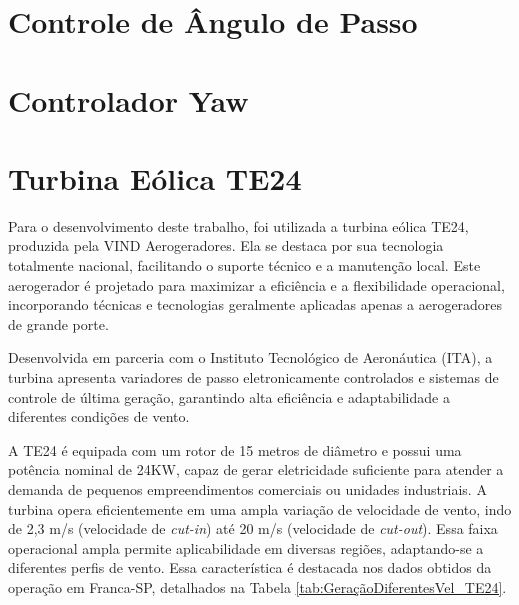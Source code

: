         
\section{Controle de Ângulo de Passo}
\section{Controlador Yaw}

\section{Turbina Eólica TE24}
    \par Para o desenvolvimento deste trabalho, foi utilizada a turbina eólica TE24, produzida pela VIND Aerogeradores. Ela se destaca por sua tecnologia totalmente nacional, facilitando o suporte técnico e a manutenção local. Este aerogerador é projetado para maximizar a eficiência e a flexibilidade operacional, incorporando técnicas e tecnologias geralmente aplicadas apenas a aerogeradores de grande porte.
    
    \par Desenvolvida em parceria com o Instituto Tecnológico de Aeronáutica (ITA), a turbina apresenta variadores de passo eletronicamente controlados e sistemas de controle de última geração, garantindo alta eficiência e adaptabilidade a diferentes condições de vento.

    \par A TE24 é equipada com um rotor de 15 metros de diâmetro e possui uma potência nominal de 24KW, capaz de gerar eletricidade suficiente para atender a demanda de pequenos empreendimentos comerciais ou unidades industriais. A turbina opera eficientemente em uma ampla variação de velocidade de vento, indo de 2,3 m/s (velocidade de \textit{cut-in}) até 20 m/s (velocidade de \textit{cut-out}). Essa faixa operacional ampla permite aplicabilidade em diversas regiões, adaptando-se a diferentes perfis de vento. Essa característica é destacada nos dados obtidos da operação em Franca-SP, detalhados na Tabela \ref{tab:GeraçãoDiferentesVel_TE24}.

